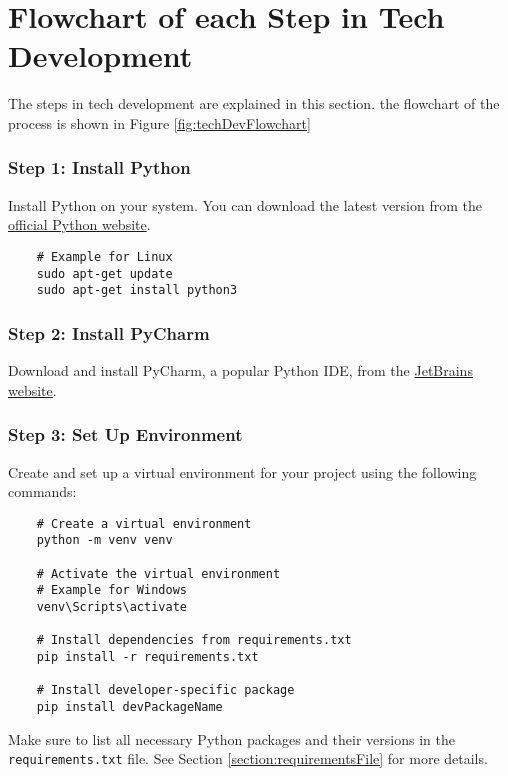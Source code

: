 \section{Flowchart of each Step in Tech Development}
\label{section:techDevSteps}

The steps in tech development are explained in this section. the flowchart of the process is shown in Figure \ref{fig:techDevFlowchart}

\subsubsection{Step 1: Install Python}

Install Python on your system. You can download the latest version from the \href{https://www.python.org/downloads/}{official Python website}.

\begin{verbatim}
	# Example for Linux
	sudo apt-get update
	sudo apt-get install python3
\end{verbatim}

\subsubsection{Step 2: Install PyCharm}

Download and install PyCharm, a popular Python IDE, from the \href{https://www.jetbrains.com/pycharm/download/}{JetBrains website}.

\subsubsection{Step 3: Set Up Environment}

Create and set up a virtual environment for your project using the following commands:

\begin{verbatim}
	# Create a virtual environment
	python -m venv venv
	
	# Activate the virtual environment
	# Example for Windows
	venv\Scripts\activate
	
	# Install dependencies from requirements.txt
	pip install -r requirements.txt
	
	# Install developer-specific package
	pip install devPackageName
\end{verbatim}

Make sure to list all necessary Python packages and their versions in the \texttt{requirements.txt} file. See Section \ref{section:requirementsFile} for more details.

